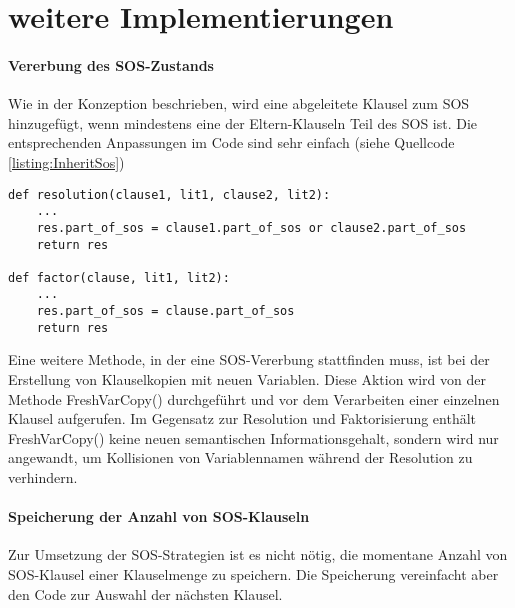 \section{weitere Implementierungen}
\paragraph{Vererbung des SOS-Zustands}
Wie in der Konzeption beschrieben, wird eine abgeleitete Klausel zum SOS hinzugefügt, wenn mindestens eine der Eltern-Klauseln Teil des SOS ist. Die entsprechenden Anpassungen im Code sind sehr einfach (siehe Quellcode \ref{listing:InheritSos})
\begin{lstlisting}[caption={Implementierung der Vererbung des SOS.Zustands an abgeleitee Klauseln}label={listing:InheritSos}]
def resolution(clause1, lit1, clause2, lit2):
	...
	res.part_of_sos = clause1.part_of_sos or clause2.part_of_sos
	return res
	
def factor(clause, lit1, lit2):
	...
	res.part_of_sos = clause.part_of_sos
	return res
\end{lstlisting}
Eine weitere Methode, in der eine SOS-Vererbung stattfinden muss, ist bei der Erstellung von Klauselkopien mit neuen Variablen. Diese Aktion wird von der Methode FreshVarCopy() durchgeführt und vor dem Verarbeiten einer einzelnen Klausel aufgerufen.
Im Gegensatz zur Resolution und Faktorisierung enthält FreshVarCopy() keine neuen semantischen Informationsgehalt, sondern wird nur angewandt, um Kollisionen von Variablennamen während der Resolution zu verhindern.


\paragraph{Speicherung der Anzahl von SOS-Klauseln}
Zur Umsetzung der SOS-Strategien ist es nicht nötig, die momentane Anzahl von SOS-Klausel einer Klauselmenge zu speichern. Die Speicherung vereinfacht aber den Code zur Auswahl der nächsten Klausel.
